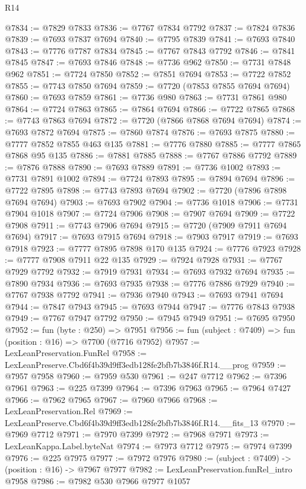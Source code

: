 \begin{lexlean}{R14}
\begin{coremodule}
@7834 := @7829 @7833
@7836 := @7767 @7834 @7792
@7837 := @7824 @7836
@7839 := @7693 @7837 @7694
@7840 := @7795 @7839
@7841 := @7693 @7840
@7843 := @7776 @7787 @7834
@7845 := @7767 @7843 @7792
@7846 := @7841 @7845
@7847 := @7693 @7846
@7848 := @7736 @962
@7850 := @7731 @7848 @962
@7851 := @7724 @7850
@7852 := @7851 @7694
@7853 := @7722 @7852
@7855 := @7743 @7850 @7694
@7859 := @7720 (@7853 @7855 @7694 @7694)
@7860 := @7693 @7859
@7861 := @7736 @980
@7863 := @7731 @7861 @980
@7864 := @7724 @7863
@7865 := @7864 @7694
@7866 := @7722 @7865
@7868 := @7743 @7863 @7694
@7872 := @7720 (@7866 @7868 @7694 @7694)
@7874 := @7693 @7872 @7694
@7875 := @7860 @7874
@7876 := @7693 @7875
@7880 := @7777 @7852 @7855 @463 @135
@7881 := @7776 @7880
@7885 := @7777 @7865 @7868 @95 @135
@7886 := @7881 @7885
@7888 := @7767 @7886 @7792
@7889 := @7876 @7888
@7890 := @7693 @7889
@7891 := @7736 @1002
@7893 := @7731 @7891 @1002
@7894 := @7724 @7893
@7895 := @7894 @7694
@7896 := @7722 @7895
@7898 := @7743 @7893 @7694
@7902 := @7720 (@7896 @7898 @7694 @7694)
@7903 := @7693 @7902
@7904 := @7736 @1018
@7906 := @7731 @7904 @1018
@7907 := @7724 @7906
@7908 := @7907 @7694
@7909 := @7722 @7908
@7911 := @7743 @7906 @7694
@7915 := @7720 (@7909 @7911 @7694 @7694)
@7917 := @7693 @7915 @7694
@7918 := @7903 @7917
@7919 := @7693 @7918
@7923 := @7777 @7895 @7898 @170 @135
@7924 := @7776 @7923
@7928 := @7777 @7908 @7911 @22 @135
@7929 := @7924 @7928
@7931 := @7767 @7929 @7792
@7932 := @7919 @7931
@7934 := @7693 @7932 @7694
@7935 := @7890 @7934
@7936 := @7693 @7935
@7938 := @7776 @7886 @7929
@7940 := @7767 @7938 @7792
@7941 := @7936 @7940
@7943 := @7693 @7941 @7694
@7944 := @7847 @7943
@7945 := @7693 @7944
@7947 := @7776 @7843 @7938
@7949 := @7767 @7947 @7792
@7950 := @7945 @7949
@7951 := @7695 @7950
@7952 := fun (byte : @250) => @7951
@7956 := fun (subject : @7409) => fun (position : @16) => @7700 (@7716 @7952)
@7957 := LexLeanPreservation.FunRel
@7958 := LexLeanPreserve.Cbd6f4b39d9ff3edb128fe2bfb7b3846f.R14.__prog
@7959 := @7957 @7958
@7960 := @7959 @530
@7961 := @247 @7712
@7962 := @7396 @7961
@7963 := @225 @7399
@7964 := @7396 @7963
@7965 := @7964 @7427
@7966 := @7962 @7965
@7967 := @7960 @7966
@7968 := LexLeanPreservation.Rel
@7969 := LexLeanPreserve.Cbd6f4b39d9ff3edb128fe2bfb7b3846f.R14.__fits_13
@7970 := @7969 @7712
@7971 := @7970 @7399
@7972 := @7968 @7971
@7973 := LexLeanKappa.Label.byteNat
@7974 := @7973 @7712
@7975 := @7974 @7399
@7976 := @225 @7975
@7977 := @7972 @7976
@7980 := (subject : @7409) -> (position : @16) -> @7967 @7977
@7982 := LexLeanPreservation.funRel_intro @7958
@7986 := @7982 @530 @7966 @7977 @1057

\end{coremodule}
\end{lexlean}
